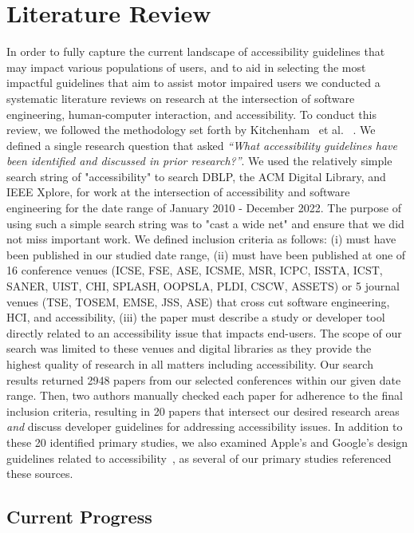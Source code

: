 \newpage
\section{Literature Review}
\label{sec:SLR}

In order to fully capture the current landscape of accessibility guidelines that may impact various populations of users, and to aid in selecting the most impactful guidelines that aim to assist motor impaired users we conducted a systematic literature reviews on research at the intersection of software engineering, human-computer interaction, and accessibility. To conduct this review, we followed the methodology set forth by Kitchenham~ et al. ~\cite{kitchenham2007guidelines}. We defined a single research question that asked \textit{``What accessibility guidelines have been identified and discussed in prior research?''}. We used the relatively simple search string of "accessibility" to search DBLP, the ACM Digital Library, and IEEE Xplore, for work at the intersection of accessibility and software engineering for the date range of January 2010 - December 2022. The purpose of using such a simple search string was to "cast a wide net" and ensure that we did not miss important work. We defined inclusion criteria as follows: (i) must have been published in our studied date range, (ii) must have been published at one of 16 conference venues (ICSE, FSE, ASE, ICSME, MSR, ICPC, ISSTA, ICST, SANER, UIST, CHI, SPLASH, OOPSLA, PLDI, CSCW, ASSETS) or 5 journal venues (TSE, TOSEM, EMSE, JSS, ASE) that cross cut software engineering, HCI, and accessibility, (iii) the paper must describe a study or developer tool directly related to an accessibility issue that impacts end-users. The scope of our search was limited to these venues and digital libraries as they provide the highest quality of research in all matters including accessibility. Our search results returned 2948 papers from our selected conferences within our given date range. Then, two authors manually checked  each paper for adherence to the final inclusion criteria, resulting in 20 papers that intersect our desired research areas \textit{and} discuss developer guidelines for addressing accessibility issues. In addition to these 20 identified primary studies, we also examined Apple's and Google's design guidelines related to accessibility~\cite{AppleAccess,GoogleAccess}, as several of our primary studies referenced these sources.




\subsection{Current Progress}

